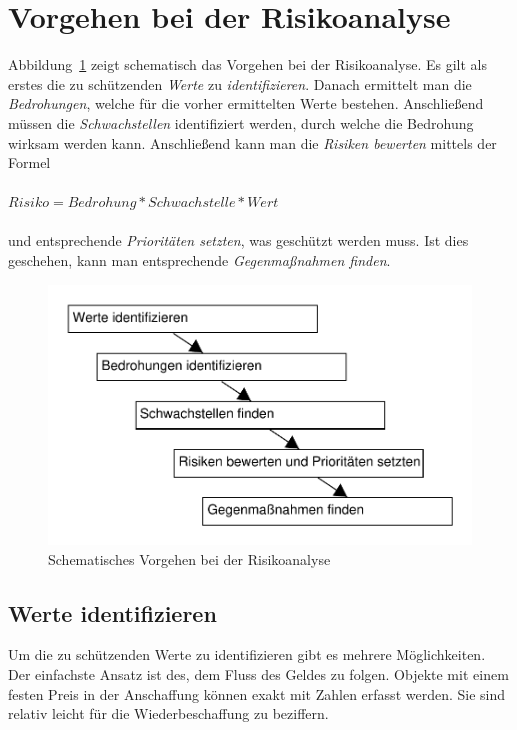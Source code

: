 \section{Vorgehen bei der Risikoanalyse}

Abbildung~\ref{5analysestufen} zeigt schematisch das Vorgehen bei der Risikoanalyse. Es gilt als erstes die zu schützenden \textit{Werte} zu \textit{identifizieren}. Danach ermittelt man die \textit{Bedrohungen}, welche für die vorher ermittelten Werte bestehen. Anschließend müssen die \textit{Schwachstellen} identifiziert werden, durch welche die Bedrohung wirksam werden kann. Anschließend kann man die \textit{Risiken bewerten} mittels der Formel
\\\\
$ Risiko = Bedrohung * Schwachstelle * Wert $
\\\\
und entsprechende \textit{Prioritäten setzten}, was geschützt werden muss. Ist dies geschehen, kann man entsprechende \textit{Gegenmaßnahmen finden}.

\begin{figure}[h]
\includegraphics[scale=0.8]{images/5analysestufen.pdf}
\caption{Schematisches Vorgehen bei der Risikoanalyse}
\label{5analysestufen}
\end{figure}



\subsection{Werte identifizieren}
Um die zu schützenden Werte zu identifizieren gibt es mehrere Möglichkeiten. Der einfachste Ansatz ist des, dem Fluss des Geldes zu folgen. Objekte mit einem festen Preis in der Anschaffung können exakt mit Zahlen erfasst werden. Sie sind relativ leicht für die Wiederbeschaffung zu beziffern. 